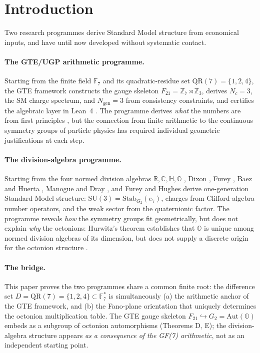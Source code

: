 \documentclass[11pt]{article}
\theoremstyle{remark}
\begin{document}
\section{Introduction}
\label{sec:intro}

Two research programmes derive Standard Model structure from economical
inputs, and have until now developed without systematic contact.

\paragraph{The GTE/UGP arithmetic programme.}
Starting from the finite field $\mathbb{F}_7$ and its quadratic-residue set
$\mathrm{QR}(7) = \{1,2,4\}$, the GTE framework \cite{SpivackGTECompleteFramework}
constructs the gauge skeleton $F_{21} = \mathbb{Z}_7\!\rtimes\!\mathbb{Z}_3$,
derives $N_c=3$, the SM charge spectrum, and $N_{\mathrm{gen}}=3$ from
consistency constraints, and certifies the algebraic layer in Lean~4
\cite{SpivackUGPFormalization,ugp-lean}.
The programme derives \emph{what} the numbers are from first principles
\cite{Spivack2025UGP}, but the connection from finite arithmetic to the continuous
symmetry groups of particle physics has required individual geometric
justifications at each step.

\paragraph{The division-algebra programme.}
Starting from the four normed division algebras $\mathbb{R}, \mathbb{C},
\mathbb{H}, \mathbb{O}$ \cite{Hurwitz1898}, Dixon \cite{Dixon1994}, Furey
\cite{Furey2015,Furey2016thesis,Furey2018}, Baez and Huerta
\cite{BaezHuerta2010,Baez2002}, Manogue and Dray \cite{ManogueDray1999},
and Furey and Hughes \cite{FureyHughes2025} derive one-generation Standard
Model structure: $\mathrm{SU}(3) = \mathrm{Stab}_{G_2}(e_7)$,
charges from Clifford-algebra number operators, and the weak sector from
the quaternionic factor.
The programme reveals \emph{how} the symmetry groups fit geometrically, but
does not explain \emph{why} the octonions: Hurwitz's theorem establishes
that $\mathbb{O}$ is unique among normed division algebras of its dimension,
but does not supply a discrete origin for the octonion structure
\cite{Baez2002,Hurwitz1898}.

\paragraph{The bridge.}
This paper proves the two programmes share a common finite root: the
difference set $D = \mathrm{QR}(7) = \{1,2,4\}\subset\mathbb{F}_7^*$
is simultaneously (a) the arithmetic anchor of the GTE framework, and
(b) the Fano-plane orientation that uniquely determines the octonion
multiplication table.
The GTE gauge skeleton $F_{21}\hookrightarrow G_2 = \mathrm{Aut}(\mathbb{O})$
embeds as a subgroup of octonion automorphisms (Theorems D, E); the division-algebra
structure appears \emph{as a consequence of the GF(7) arithmetic}, not as an
independent starting point.
\end{document}
